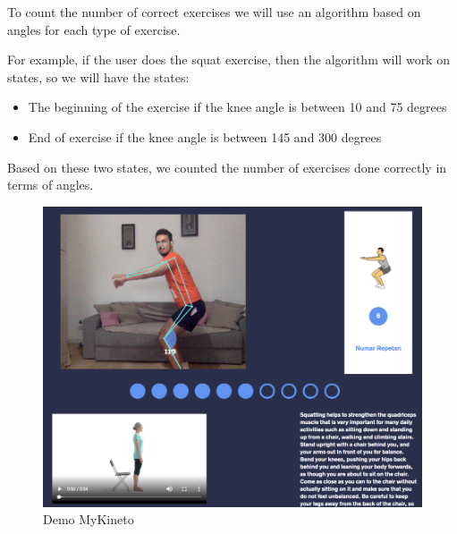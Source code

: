 To count the number of correct exercises we will use an algorithm based on angles for each type of exercise.

For example, if the user does the squat exercise, then the algorithm will work on states, so we will have the states:
\begin{itemize}
    \item The beginning of the exercise if the knee angle is between 10 and 75 degrees
    \item End of exercise if the knee angle is between 145 and 300 degrees
\end{itemize}

Based on these two states, we counted the number of exercises done correctly in terms of angles.

 \begin{figure}[htbp]
	\centerline{\includegraphics[scale=0.7]{fig/demo-mykineto.png}}  
	\caption{Demo MyKineto}
	\label{fig:demo-web-mykineto}
\end{figure}

